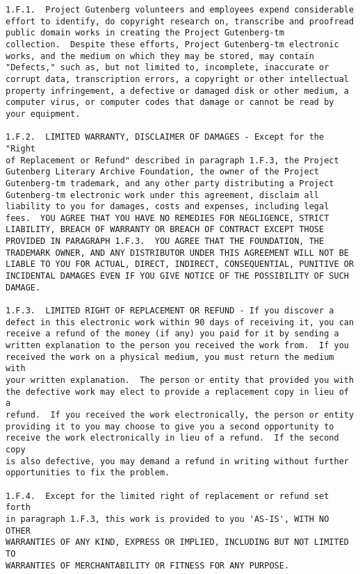 \documentclass[oneside]{book}
\begin{document}
\begin{verbatim}
1.F.1.  Project Gutenberg volunteers and employees expend considerable
effort to identify, do copyright research on, transcribe and proofread
public domain works in creating the Project Gutenberg-tm
collection.  Despite these efforts, Project Gutenberg-tm electronic
works, and the medium on which they may be stored, may contain
"Defects," such as, but not limited to, incomplete, inaccurate or
corrupt data, transcription errors, a copyright or other intellectual
property infringement, a defective or damaged disk or other medium, a
computer virus, or computer codes that damage or cannot be read by
your equipment.

1.F.2.  LIMITED WARRANTY, DISCLAIMER OF DAMAGES - Except for the "Right
of Replacement or Refund" described in paragraph 1.F.3, the Project
Gutenberg Literary Archive Foundation, the owner of the Project
Gutenberg-tm trademark, and any other party distributing a Project
Gutenberg-tm electronic work under this agreement, disclaim all
liability to you for damages, costs and expenses, including legal
fees.  YOU AGREE THAT YOU HAVE NO REMEDIES FOR NEGLIGENCE, STRICT
LIABILITY, BREACH OF WARRANTY OR BREACH OF CONTRACT EXCEPT THOSE
PROVIDED IN PARAGRAPH 1.F.3.  YOU AGREE THAT THE FOUNDATION, THE
TRADEMARK OWNER, AND ANY DISTRIBUTOR UNDER THIS AGREEMENT WILL NOT BE
LIABLE TO YOU FOR ACTUAL, DIRECT, INDIRECT, CONSEQUENTIAL, PUNITIVE OR
INCIDENTAL DAMAGES EVEN IF YOU GIVE NOTICE OF THE POSSIBILITY OF SUCH
DAMAGE.

1.F.3.  LIMITED RIGHT OF REPLACEMENT OR REFUND - If you discover a
defect in this electronic work within 90 days of receiving it, you can
receive a refund of the money (if any) you paid for it by sending a
written explanation to the person you received the work from.  If you
received the work on a physical medium, you must return the medium with
your written explanation.  The person or entity that provided you with
the defective work may elect to provide a replacement copy in lieu of a
refund.  If you received the work electronically, the person or entity
providing it to you may choose to give you a second opportunity to
receive the work electronically in lieu of a refund.  If the second copy
is also defective, you may demand a refund in writing without further
opportunities to fix the problem.

1.F.4.  Except for the limited right of replacement or refund set forth
in paragraph 1.F.3, this work is provided to you 'AS-IS', WITH NO OTHER
WARRANTIES OF ANY KIND, EXPRESS OR IMPLIED, INCLUDING BUT NOT LIMITED TO
WARRANTIES OF MERCHANTABILITY OR FITNESS FOR ANY PURPOSE.


\end{verbatim}
\end{document}

